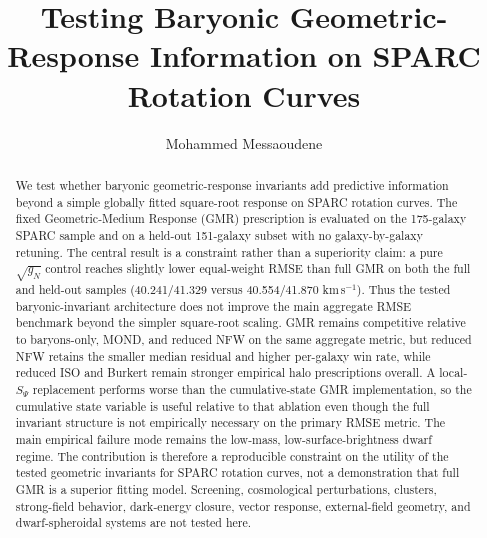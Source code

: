 ﻿\documentclass[twocolumn,linenumbers]{aastex701}
\begin{document}
\pagestyle{plain}

 \title{Testing Baryonic Geometric-Response Information on SPARC Rotation Curves}
 \author{Mohammed Messaoudene}
\begin{abstract}
We test whether baryonic geometric-response invariants add predictive information beyond a simple globally fitted square-root response on SPARC rotation curves. The fixed Geometric-Medium Response (GMR) prescription is evaluated on the 175-galaxy SPARC sample and on a held-out 151-galaxy subset with no galaxy-by-galaxy retuning. The central result is a constraint rather than a superiority claim: a pure $\sqrt{g_N}$ control reaches slightly lower equal-weight RMSE than full GMR on both the full and held-out samples (40.241/41.329 versus 40.554/41.870 km\,s$^{-1}$). Thus the tested baryonic-invariant architecture does not improve the main aggregate RMSE benchmark beyond the simpler square-root scaling. GMR remains competitive relative to baryons-only, MOND, and reduced NFW on the same aggregate metric, but reduced NFW retains the smaller median residual and higher per-galaxy win rate, while reduced ISO and Burkert remain stronger empirical halo prescriptions overall. A local-$S_\Psi$ replacement performs worse than the cumulative-state GMR implementation, so the cumulative state variable is useful relative to that ablation even though the full invariant structure is not empirically necessary on the primary RMSE metric. The main empirical failure mode remains the low-mass, low-surface-brightness dwarf regime. The contribution is therefore a reproducible constraint on the utility of the tested geometric invariants for SPARC rotation curves, not a demonstration that full GMR is a superior fitting model. Screening, cosmological perturbations, clusters, strong-field behavior, dark-energy closure, vector response, external-field geometry, and dwarf-spheroidal systems are not tested here.
\end{abstract}
\end{document}
